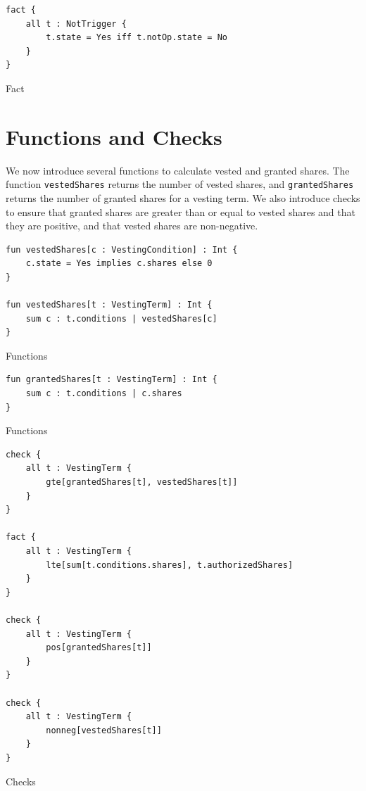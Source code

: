 \begin{listing}[H]\label{fig:vs:fact-not-trigger-eval}
	\begin{verbatim}
fact {
    all t : NotTrigger {
        t.state = Yes iff t.notOp.state = No
    }
}
\end{verbatim}
	\caption{Fact}
\end{listing}

\section{Functions and Checks}

We now introduce several functions to calculate vested and granted shares. The function \verb|vestedShares| returns the number of vested shares, and \verb|grantedShares| returns the number of granted shares for a vesting term. We also introduce checks to ensure that granted shares are greater than or equal to vested shares and that they are positive, and that vested shares are non-negative.

\begin{listing}[H]\label{fig:vs:fun-vested-shares}
	\begin{verbatim}
fun vestedShares[c : VestingCondition] : Int {
    c.state = Yes implies c.shares else 0
}

fun vestedShares[t : VestingTerm] : Int {
    sum c : t.conditions | vestedShares[c]
}
\end{verbatim}
	\caption{Functions}
\end{listing}

\begin{listing}[H]\label{fig:vs:fun-granted-shares}
	\begin{verbatim}
fun grantedShares[t : VestingTerm] : Int {
    sum c : t.conditions | c.shares
}
\end{verbatim}
	\caption{Functions}
\end{listing}

\begin{listing}[H]\label{fig:vs:check-granted-shares-gte-vested-shares}
	\begin{verbatim}
check {
    all t : VestingTerm {
        gte[grantedShares[t], vestedShares[t]]
    }  
}

fact {
    all t : VestingTerm {
        lte[sum[t.conditions.shares], t.authorizedShares]
    }
}

check {
    all t : VestingTerm {
        pos[grantedShares[t]]
    }  
}

check {
    all t : VestingTerm {
        nonneg[vestedShares[t]]
    }  
}
\end{verbatim}
	\caption{Checks}
\end{listing}

